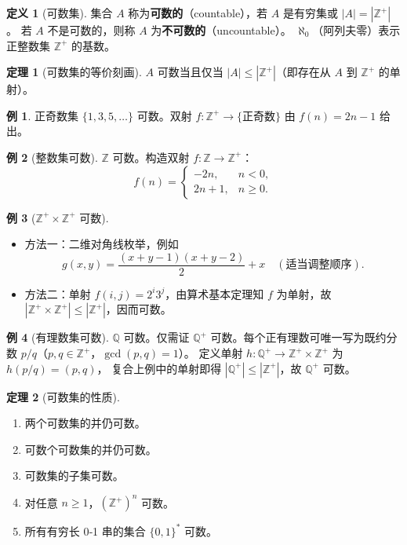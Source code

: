 \documentclass[UTF8,11pt,a4paper]{ctexbook}   %
\theoremstyle{definition}
\newtheorem{definition}{定义}[section]
\newtheorem{theorem}{定理}[section]
\newtheorem{example}{例}[section]
\begin{document}
\begin{definition}[可数集]
集合 $A$ 称为\textbf{可数的}（countable），若 $A$ 是有穷集或 $|A|=|\mathbb{Z}^+|$。
若 $A$ 不是可数的，则称 $A$ 为\textbf{不可数的}（uncountable）。
$\aleph_0$（阿列夫零）表示正整数集 $\mathbb{Z}^+$ 的基数。
\end{definition}

\begin{theorem}[可数集的等价刻画]
$A$ 可数当且仅当 $|A|\leq|\mathbb{Z}^+|$（即存在从 $A$ 到 $\mathbb{Z}^+$ 的单射）。
\end{theorem}

\begin{example}
正奇数集 $\{1,3,5,\dots\}$ 可数。双射 $f:\mathbb{Z}^+\to\{ \text{正奇数} \}$ 由 $f(n)=2n-1$ 给出。
\end{example}

\begin{example}[整数集可数]
$\mathbb{Z}$ 可数。构造双射 $f:\mathbb{Z}\to\mathbb{Z}^+$：
\[
f(n) = \begin{cases}
-2n, & n < 0,\\
2n+1, & n \geq 0 .
\end{cases}
\]
\end{example}

\begin{example}[$\mathbb{Z}^+\times\mathbb{Z}^+$ 可数]
\begin{itemize}
    \item 方法一：二维对角线枚举，例如
    \[
    g(x,y) = \frac{(x+y-1)(x+y-2)}{2}+x \quad (\text{适当调整顺序}).
    \]
    \item 方法二：单射 $f(i,j)=2^i3^j$，由算术基本定理知 $f$ 为单射，故 $|\mathbb{Z}^+\times\mathbb{Z}^+|\leq|\mathbb{Z}^+|$，因而可数。
\end{itemize}
\end{example}

\begin{example}[有理数集可数]
$\mathbb{Q}$ 可数。仅需证 $\mathbb{Q}^+$ 可数。每个正有理数可唯一写为既约分数 $p/q$（$p,q\in\mathbb{Z}^+$，$\gcd(p,q)=1$）。
定义单射 $h:\mathbb{Q}^+\to\mathbb{Z}^+\times\mathbb{Z}^+$ 为 $h(p/q)=(p,q)$，
复合上例中的单射即得 $|\mathbb{Q}^+|\leq|\mathbb{Z}^+|$，故 $\mathbb{Q}^+$ 可数。
\end{example}

\begin{theorem}[可数集的性质]
\begin{enumerate}
    \item 两个可数集的并仍可数。
    \item 可数个可数集的并仍可数。
    \item 可数集的子集可数。
    \item 对任意 $n\geq1$，$(\mathbb{Z}^+)^n$ 可数。
    \item 所有有穷长 0‑1 串的集合 $\{0,1\}^*$ 可数。
\end{enumerate}
\end{theorem}
\end{document}
